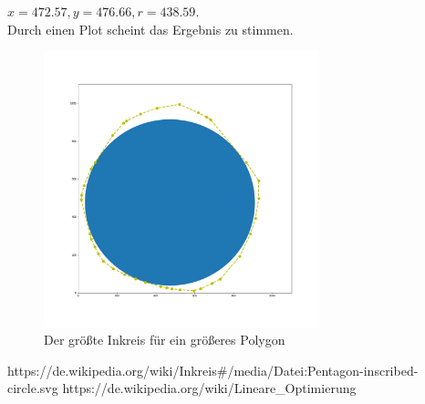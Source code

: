 \documentclass[conference]{IEEEtran}
\begin{document}
	 $x = 472.57, y = 476.66, r = 438.59$.\\
	Durch einen Plot scheint das Ergebnis zu stimmen.
	\begin{figure}[h]
		\begin{center}
			\includegraphics[width=8cm]{Inscribed.png}
			\caption{Der größte Inkreis für ein größeres Polygon}
			\label{fail}
		\end{center}
	\end{figure}

	
	\begin{thebibliography}{00}
		https://de.wikipedia.org/wiki/Inkreis\#/media/Datei:Pentagon-inscribed-circle.svg
		https://de.wikipedia.org/wiki/Lineare\_Optimierung
	\end{thebibliography}
	
	
	
\end{document}
